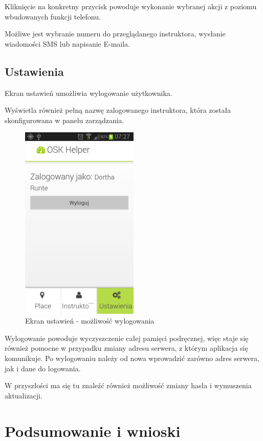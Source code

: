\documentclass[twoside,a4paper,openright,12pt]{book}
\begin{document}
Kliknięcie na konkretny przycisk powoduje wykonanie wybranej akcji z poziomu wbudowanych funkcji telefonu.

Możliwe jest wybranie numeru do przeglądanego instruktora, wysłanie wiadomości SMS lub napisanie E-maila.

\newpage
\section{Ustawienia}

Ekran ustawień umożliwia wylogowanie użytkownika.

Wyświetla również pełną nazwę zalogowanego instruktora, która została skonfigurowana w panelu zarządzania.

\begin{figure}[H]
\centering
\includegraphics[width=0.5\textwidth]{screenshots/android/ustawienia.png}
\caption{Ekran ustawień - możliwość wylogowania}
\label{fig:Ustawienia_mobile}
\end{figure}

Wylogowanie powoduje wyczyszczenie całej pamięci podręcznej, więc staje się również pomocne w przypadku zmiany adresu serwera, z którym aplikacja się komunikuje. Po wylogowaniu należy od nowa wprowadzić zarówno adres serwera, jak i dane do logowania.

W przyszłości ma się tu znaleźć również możliwość zmiany hasła i wymuszenia aktualizacji.


\chapter{Podsumowanie i wnioski}
\end{document}
